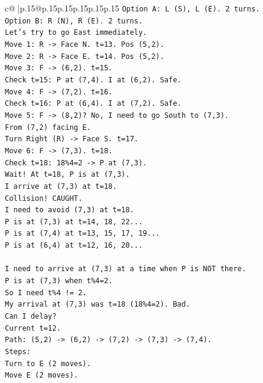 \documentclass{article}
\begin{document}
{\begin{supertabular}{c@{$\;$}|p{.15\linewidth}@{}p{.15\linewidth}p{.15\linewidth}p{.15\linewidth}p{.15\linewidth}p{.15\linewidth}}
{{{\texttt{Option A: L (S), L (E). 2 turns.} \\
\texttt{Option B: R (N), R (E). 2 turns.} \\
\texttt{Let's try to go East immediately.} \\
\texttt{Move 1: R {-}> Face N. t=13. Pos (5,2).} \\
\texttt{Move 2: R {-}> Face E. t=14. Pos (5,2).} \\
\texttt{Move 3: F {-}> (6,2). t=15.} \\
\texttt{Check t=15: P at (7,4). I at (6,2). Safe.} \\
\texttt{Move 4: F {-}> (7,2). t=16.} \\
\texttt{Check t=16: P at (6,4). I at (7,2). Safe.} \\
\texttt{Move 5: F {-}> (8,2)? No, I need to go South to (7,3).} \\
\texttt{From (7,2) facing E.} \\
\texttt{Turn Right (R) {-}> Face S. t=17.} \\
\texttt{Move 6: F {-}> (7,3). t=18.} \\
\texttt{Check t=18: 18\%4=2 {-}> P at (7,3).} \\
\texttt{Wait! At t=18, P is at (7,3).} \\
\texttt{I arrive at (7,3) at t=18.} \\
\texttt{Collision! CAUGHT.} \\
\texttt{I need to avoid (7,3) at t=18.} \\
\texttt{P is at (7,3) at t=14, 18, 22...} \\
\texttt{P is at (7,4) at t=13, 15, 17, 19...} \\
\texttt{P is at (6,4) at t=12, 16, 20...} \\
\\ 
\texttt{I need to arrive at (7,3) at a time when P is NOT there.} \\
\texttt{P is at (7,3) when t\%4=2.} \\
\texttt{So I need t\%4 != 2.} \\
\texttt{My arrival at (7,3) was t=18 (18\%4=2). Bad.} \\
\texttt{Can I delay?} \\
\texttt{Current t=12.} \\
\texttt{Path: (5,2) {-}> (6,2) {-}> (7,2) {-}> (7,3) {-}> (7,4).} \\
\texttt{Steps:} \\
\texttt{Turn to E (2 moves).} \\
\texttt{Move E (2 moves).} \\
}}}
\end{supertabular}}
\end{document}
